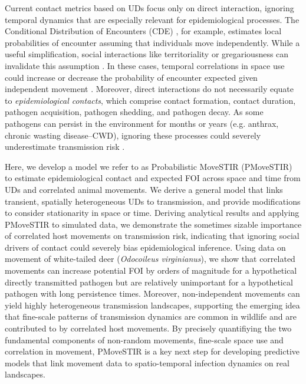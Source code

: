 ﻿\documentclass[11pt]{article}
\begin{document}
Current contact metrics based on UDs focus only on direct interaction, ignoring temporal dynamics that are especially relevant for epidemiological processes. The Conditional Distribution of Encounters (CDE) \citep{Noonan2021}, for example, estimates local probabilities of encounter assuming that individuals move independently.
While a useful simplification, social interactions like territoriality or gregariousness can invalidate this assumption \citep{Manlove2018,Sah2018}. In these cases, temporal correlations in space use could increase or decrease the probability of encounter expected given independent movement \citep{Kjaer2008,Schauber2015a}. 
Moreover, direct interactions do not necessarily equate to \emph{epidemiological contacts}, which comprise contact formation, contact duration, pathogen acquisition, pathogen shedding, and pathogen decay. As some pathogens can persist in the environment for months or years (e.g. anthrax, chronic wasting disease--CWD), ignoring these processes could severely underestimate transmission risk \citep{Wilber2022,Yang2023,Richardson2015}.


Here, we develop a model we refer to as Probabilistic MoveSTIR (PMoveSTIR) to estimate epidemiological contact and expected FOI across space and time from UDs and correlated animal movements. We derive a general model that links transient, spatially heterogeneous UDs to transmission, and provide modifications to consider stationarity in space or time.
Deriving analytical results and applying PMoveSTIR to simulated data, we demonstrate the sometimes sizable importance of correlated host movements on  transmission risk, indicating that ignoring social drivers of contact could severely bias epidemiological inference. Using data on movement of white-tailed deer (\emph{Odocoileus virginianus}), we show that correlated movements can increase potential FOI by orders of magnitude for a hypothetical directly transmitted pathogen but are relatively unimportant for a hypothetical pathogen with long persistence times. Moreover, non-independent movements can yield highly heterogeneous transmission landscapes, supporting the emerging idea that fine-scale patterns of transmission dynamics are common in wildlife \citep{Albery2021} and are contributed to by correlated host movements. By precisely quantifiying the two fundamental components of non-random movements, fine-scale space use and correlation in movement, PMoveSTIR is a key next step for developing predictive models that link movement data to spatio-temporal infection dynamics on real landscapes.
\end{document}
